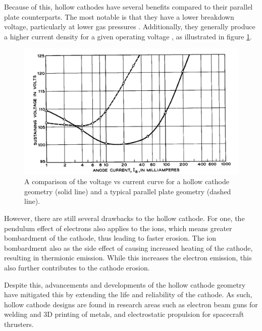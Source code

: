  Because of this, hollow cathodes have several benefits compared to their parallel plate counterparts. The most notable is that they have a lower breakdown voltage, particularly at lower gas pressures \cite{Kolobov2015, Eichhorn1993}. Additionally, they generally produce a higher current density for a given operating voltage \cite{Kolobov2015, Pillow1981}, as illustrated in figure \ref{fig:current_density_hollow_cathode}. 

\begin{figure}[h!]
	\centering
	\includegraphics[width=0.95\linewidth]{chapter_2/figures/current_density_hollow_cathode.png}
	\caption{A comparison of the voltage vs current curve for a hollow cathode geometry (solid line) and a typical parallel plate geometry (dashed line)\cite{watson_gewartewski_1965}.}
	\label{fig:current_density_hollow_cathode}
\end{figure}

However, there are still several drawbacks to the hollow cathode. For one, the pendulum effect of electrons also applies to the ions, which means greater bombardment of the cathode, thus leading to faster erosion. The ion bombardment also as the side effect of causing increased heating of the cathode, resulting in thermionic emission. While this increases the electron emission, this also further contributes to the cathode erosion. 

Despite this, advancements and developments of the hollow cathode geometry have mitigated this by extending the life and reliability of the cathode. As such, hollow cathode designs are found in research areas such as electron beam guns \cite{Kornilov2009, YuBakeev2018} for welding and 3D printing of metals, and electrostatic propulsion \cite{Goebel2021} for spacecraft thrusters.



